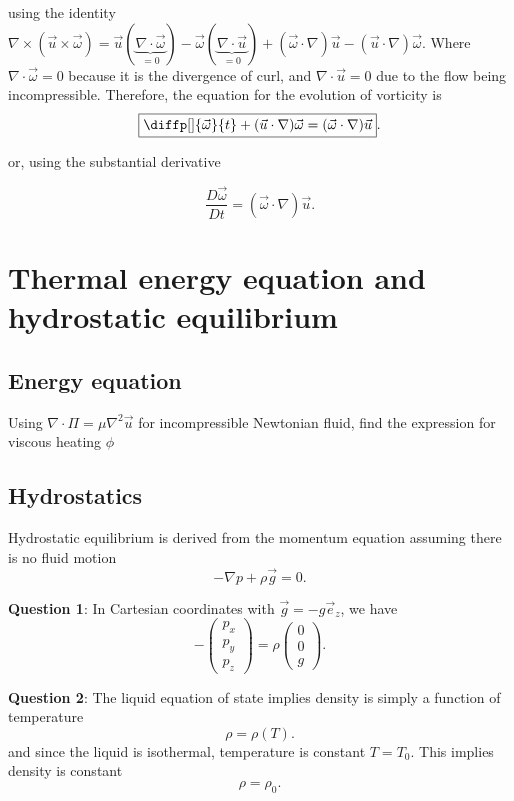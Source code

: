 using the identity $ \nabla\times (\vec{u}\times\vec{ \omega})= \vec{u}
( \underbrace{\nabla \cdot \vec{ \omega}}_{=0}) - \vec{ \omega}
( \underbrace{\nabla \cdot \vec{u}}_{=0})+ (\vec{
\omega} \cdot \nabla)\vec{u}- (\vec{u} \cdot \nabla) \vec{ \omega}$. Where
$ \nabla \cdot \vec{ \omega} = 0$ because it is the divergence of curl, and
$ \nabla \cdot \vec{u} = 0$ due to the flow being incompressible. Therefore,
the equation for the evolution of vorticity is
\[
  \boxed{\diffp[]{\vec{ \omega}}{t} + (\vec{u} \cdot \nabla)\vec{ \omega}
  = (\vec{ \omega} \cdot \nabla)\vec{u}}
.\] 

or, using the substantial derivative

\[
  \boxed{\frac{D\vec{ \omega}}{Dt} =(\vec{ \omega} \cdot \nabla)\vec{u}}
.\] 


\section{Thermal energy equation and hydrostatic equilibrium}%

\subsection{Energy equation}%

Using $\nabla\cdot\Pi=\mu\nabla^{2}\vec{u}$ for incompressible Newtonian fluid,
find the expression for viscous heating $ \phi$

\subsection{Hydrostatics}%
Hydrostatic equilibrium is derived from the momentum equation assuming there is no fluid motion
\[
-\nabla p + \rho \vec{g} = 0
.\] 

\textbf{Question 1}: In Cartesian coordinates with $\vec{g} = -g\vec{e}_{z}$,
we have
\[
- \begin{pmatrix}
  p_{x}\\p_{y}\\p_{z}
\end{pmatrix} = \rho \begin{pmatrix}
  0\\0\\g
\end{pmatrix}
.\] 

\textbf{Question 2}: The liquid equation of state implies density is simply
a function of temperature
\[
  \rho = \rho(T)
.\] 
and since the liquid is isothermal, temperature is constant $T=T_0$. This
implies density is constant
\[
\rho = \rho_0
.\] 

